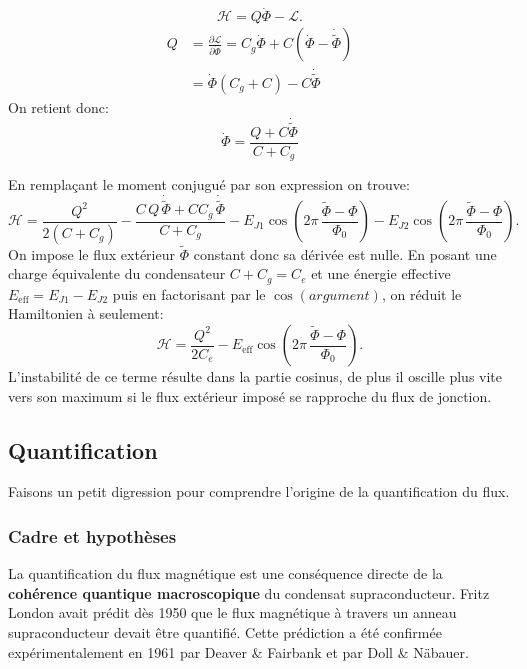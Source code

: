 \begin{equation}
\mathcal{H}=Q\dot{\Phi}-\mathcal{L}.
\end{equation}
\begin{align}
Q  &= \frac{\partial \mathcal{L}}{\partial \dot{\Phi}} = C_g \dot{\Phi}+C\left(\dot{\Phi}-\dot{\tilde{\Phi}}\right) \\
    &=\dot{\Phi}\left(C_g+C\right)-C\dot{\tilde{\Phi}}
\label{sec:f}
\end{align}
On retient donc:
\begin{equation}
\dot{\Phi}=\frac{Q+C\dot{\tilde{\Phi}}}{C+C_g}
\end{equation}

En remplaçant le moment conjugué par son expression on trouve:
\begin{equation}
\mathcal{H}
= \frac{Q^{2}}{2(C + C_{g})}
- \frac{C\,Q\,\dot{\tilde{\Phi}} + C C_{g}\,\dot{\tilde{\Phi}}}{C + C_{g}}
- E_{J1}\cos\!\left( 2\pi\,\frac{\tilde{\Phi} - \Phi}{\Phi_{0}} \right)
- E_{J2}\cos\!\left( 2\pi\,\frac{\tilde{\Phi} - \Phi}{\Phi_{0}} \right).
\end{equation}
On impose le flux extérieur $\tilde{\Phi}$ constant donc sa dérivée est nulle. En posant une charge équivalente du condensateur $C+C_g=C_e$ et une énergie effective $E_{\mathrm{eff}}=E_{J1}-E_{J2}$ puis en factorisant par le $\cos{(argument)}$, on réduit le Hamiltonien  à seulement:
\begin{equation}
\mathcal{H}= \frac{Q^{2}}{2C_e}-E_{\mathrm{eff}}\cos\!\left( 2\pi\,\frac{\tilde{\Phi} - \Phi}{\Phi_{0}} \right).
\label{sec:qt}
\end{equation}
L'instabilité de ce terme résulte dans la partie cosinus, de plus il oscille plus vite vers son maximum si le flux extérieur imposé se rapproche du flux de jonction. 

\subsection{Quantification}
Faisons un petit digression pour comprendre l'origine de la quantification du flux.

\subsubsection{Cadre et hypoth\`eses}

La quantification du flux magn\'etique est une cons\'equence directe de la \textbf{coh\'erence quantique macroscopique} du condensat supraconducteur. Fritz London avait pr\'edit d\`es 1950 que le flux magn\'etique \`a travers un anneau supraconducteur devait \^etre quantifi\'e. Cette pr\'ediction a \'et\'e confirm\'ee exp\'erimentalement en 1961 par Deaver \& Fairbank et par Doll \& N\"abauer.


